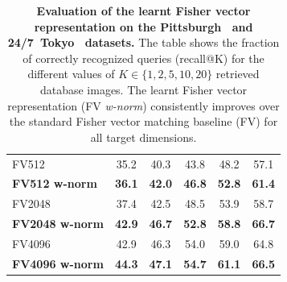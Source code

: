 \begin{table}[th!]
\begin{centering}
\begin{tabularx}{0.883\linewidth}{|l|c c c c c|}
          \hline  
        \rowcolor{maroon!10}
        {FV512}             &{35.2}      
                                &{40.3}       
                                &{43.8}      
                                &{48.2}      
                                &{57.1} \\
        \rowcolor{maroon!10}
        {\textbf{FV512 w-norm}}     &{\textbf{36.1}}       
                                &{\textbf{42.0}}      
                                &{\textbf{46.8}}
                                &{\textbf{52.8}}       
                                &{\textbf{61.4}} \\ 
          \hline   
          \rowcolor{maroon!10}
          {FV2048}            &{37.4}       
                                  &{42.5}       
                                  &{48.5}       
                                  &{53.9}       
                                  &{58.7}   \\
          \rowcolor{maroon!10}
        {\textbf{FV2048 w-norm}}    &{\textbf{42.9}}       
                                &{\textbf{46.7}}       
                                &{\textbf{52.8}}       
                                &{\textbf{58.8}}       
                                &{\textbf{66.7}} \\
          \rowcolor{maroon!10}
          \hline   
          {FV4096}            &{42.9}     
                                  &{46.3}     
                                  &{54.0}     
                                  &{59.0}    
                                  &{64.8}   \\ 
          \rowcolor{maroon!10}
          {\textbf{FV4096 w-norm}}  &{\textbf{44.3}}      
                                    &{\textbf{47.1}}      
                                    &{\textbf{54.7}}      
                                    &{\textbf{61.1}}      
                                    &{\textbf{66.5}}  \\
          \hline
      \end{tabularx}
      \caption{ 
        \textbf{Evaluation of the learnt Fisher vector representation on the Pittsburgh~\cite{Gronat13} and 24/7~Tokyo~\cite{Torii2015} datasets.}
        The table shows the fraction of correctly recognized queries (recall@K) for the different values of $K\in\{1,2,5,10,20\}$ retrieved database images. The learnt Fisher vector representation (FV \emph{w-norm}) consistently improves over the standard Fisher vector matching baseline (FV) for all target dimensions.
      }
      \label{tab:recallFV}
      \end{centering}
    \end{table}
